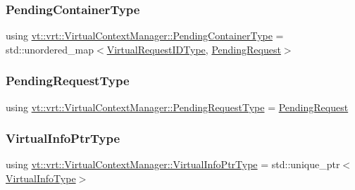 \subsubsection{\texorpdfstring{Pending\+Container\+Type}{PendingContainerType}}
{\footnotesize\ttfamily using \hyperlink{structvt_1_1vrt_1_1_virtual_context_manager_a85080f8107ed08c3a7fdd8114c724ce2}{vt\+::vrt\+::\+Virtual\+Context\+Manager\+::\+Pending\+Container\+Type} =  std\+::unordered\+\_\+map$<$\hyperlink{namespacevt_1_1vrt_ac7ef8820ebfc383fa16f09bf46eaa2b8}{Virtual\+Request\+I\+D\+Type}, \hyperlink{structvt_1_1vrt_1_1_pending_request}{Pending\+Request}$>$}

\mbox{\label{structvt_1_1vrt_1_1_virtual_context_manager_a0d3901c038c192969202b16e4ab05d8a}} 
\subsubsection{\texorpdfstring{Pending\+Request\+Type}{PendingRequestType}}
{\footnotesize\ttfamily using \hyperlink{structvt_1_1vrt_1_1_virtual_context_manager_a0d3901c038c192969202b16e4ab05d8a}{vt\+::vrt\+::\+Virtual\+Context\+Manager\+::\+Pending\+Request\+Type} =  \hyperlink{structvt_1_1vrt_1_1_pending_request}{Pending\+Request}}

\mbox{\label{structvt_1_1vrt_1_1_virtual_context_manager_aa63e106c968a01d4d437d535c4ef9d02}} 
\subsubsection{\texorpdfstring{Virtual\+Info\+Ptr\+Type}{VirtualInfoPtrType}}
{\footnotesize\ttfamily using \hyperlink{structvt_1_1vrt_1_1_virtual_context_manager_aa63e106c968a01d4d437d535c4ef9d02}{vt\+::vrt\+::\+Virtual\+Context\+Manager\+::\+Virtual\+Info\+Ptr\+Type} =  std\+::unique\+\_\+ptr$<$\hyperlink{structvt_1_1vrt_1_1_virtual_context_manager_ad2cd828dbd8886166b4ceb3776c49239}{Virtual\+Info\+Type}$>$}

